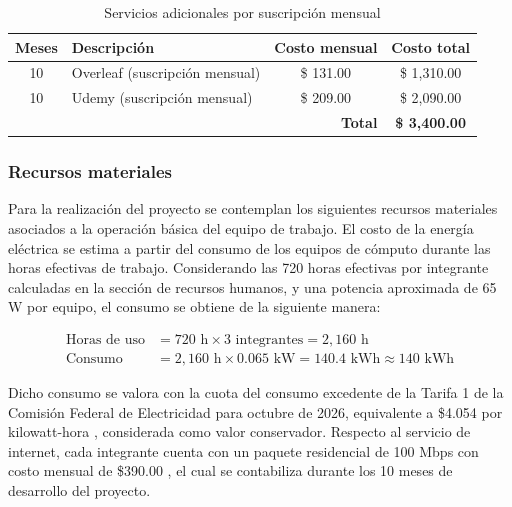 \begin{table}[htbp]
    \centering
    \caption[Servicios adicionales por suscripción mensual]{Servicios adicionales por suscripción mensual}
    \label{tab:servicios_adicionales}
    \begin{tabular}{|c|l|c|c|}
        \hline
        \textbf{Meses} & \textbf{Descripción} & \textbf{Costo mensual} & \textbf{Costo total} \\ \hline
        10 & Overleaf (suscripción mensual) & \$ 131.00 & \$ 1,310.00 \\ \hline
        10 & Udemy (suscripción mensual) & \$ 209.00 & \$ 2,090.00 \\ \hline
        \multicolumn{3}{|r|}{\textbf{Total}} & \textbf{\$ 3,400.00} \\ \hline
    \end{tabular}%
\end{table}

\subsubsection{Recursos materiales}

Para la realización del proyecto se contemplan los siguientes recursos materiales asociados a la operación básica del equipo de trabajo. El costo de la energía eléctrica se estima a partir del consumo de los equipos de cómputo durante las horas efectivas de trabajo. Considerando las 720 horas efectivas por integrante calculadas en la sección de recursos humanos, y una potencia aproximada de 65 W por equipo, el consumo se obtiene de la siguiente manera:

\begin{align*}
\text{Horas de uso} &= 720 \text{ h} \times 3 \text{ integrantes} = 2{,}160 \text{ h} \\
\text{Consumo} &= 2{,}160 \text{ h} \times 0.065 \text{ kW} = 140.4 \text{ kWh} \approx 140 \text{ kWh}
\end{align*}

Dicho consumo se valora con la cuota del consumo excedente de la Tarifa 1 de la Comisión Federal de Electricidad para octubre de 2026, equivalente a \$4.054 por kilowatt-hora \cite{cfe_tarifa1}, considerada como valor conservador. Respecto al servicio de internet, cada integrante cuenta con un paquete residencial de 100 Mbps con costo mensual de \$390.00 \cite{totalplay_paquetes}, el cual se contabiliza durante los 10 meses de desarrollo del proyecto.

